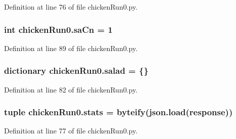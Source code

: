 Definition at line 76 of file chicken\-Run0.\-py.

\hypertarget{namespacechickenRun0_aea5c25f9af132c481e1a6466f3381165}{
\subsubsection[{sa\-Cn}]{\setlength{\rightskip}{0pt plus 5cm}int chicken\-Run0.\-sa\-Cn = 1}}\label{namespacechickenRun0_aea5c25f9af132c481e1a6466f3381165}


Definition at line 89 of file chicken\-Run0.\-py.

\hypertarget{namespacechickenRun0_afe309d6f6c9cb974a3e3cdd459ba4e49}{
\subsubsection[{salad}]{\setlength{\rightskip}{0pt plus 5cm}dictionary chicken\-Run0.\-salad = \{\}}}\label{namespacechickenRun0_afe309d6f6c9cb974a3e3cdd459ba4e49}


Definition at line 82 of file chicken\-Run0.\-py.

\hypertarget{namespacechickenRun0_a7498517386ad443ac950fd093cb6e7a6}{
\subsubsection[{stats}]{\setlength{\rightskip}{0pt plus 5cm}tuple chicken\-Run0.\-stats = {\bf byteify}(json.\-load({\bf response}))}}\label{namespacechickenRun0_a7498517386ad443ac950fd093cb6e7a6}


Definition at line 77 of file chicken\-Run0.\-py.

